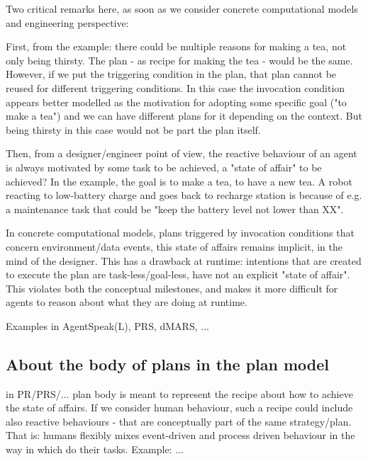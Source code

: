 Two critical remarks here, as soon as we consider concrete computational models and engineering perspective:

First, from the example: there could be multiple reasons for making a tea, not only being thirsty. The plan - as recipe for making the tea - would be the same. However, if we put the triggering condition in the plan, that plan cannot be reused for different triggering conditions.
%
In this case the invocation condition appears better modelled as the motivation for adopting some specific goal ("to make a tea") and we can have different plans for it depending on the context.
%
But being thirsty in this case would not be part the plan itself.

Then,  from a designer/engineer point of view, the reactive behaviour of an agent is always motivated by some task to be achieved, a "state of affair" to be achieved? 
%
In the example, the goal is to make a tea, to have a new tea. A robot reacting to low-battery charge and goes back to recharge station is because of e.g. a maintenance task that could be "keep the battery level not lower than XX".
%

In concrete computational models, plans triggered by invocation conditions that concern environment/data events, this state of affairs remains implicit, in the mind of the designer.
%
This has a drawback at runtime: intentions that are created to execute the plan are task-less/goal-less, have not an explicit "state of affair".
%
This violates both the conceptual milestones, and makes it more difficult for agents to reason about what they are doing at runtime.

Examples in AgentSpeak(L), PRS, dMARS, ...


\subsection{About the body of plans in the plan model}

in PR/PRS/... plan body is meant to represent the recipe about how to achieve the state of affairs.
%
If we consider human behaviour, such a recipe could include also reactive behaviours - that are conceptually part of the same strategy/plan.
%
That is: humans  flexibly mixes event-driven and process driven behaviour in the way in which do their tasks.
%
Example: ...

